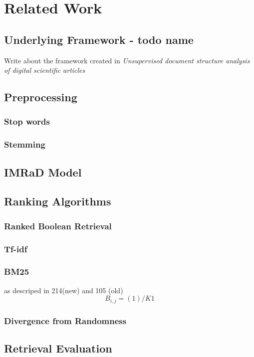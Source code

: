 \chapter{Related Work}
\label{cha:related_work}

\section{Underlying Framework - todo name}
\label{sec:underlying-framework}

Write about the framework created in \textit{Unsupervised document structure analysis of digital scientific articles}

\section{Preprocessing}
\label{sec:preprocessing}

\subsection{Stop words}
\label{sec:stop_words}

\subsection{Stemming}
\label{sec:stemming}

\section{IMRaD Model}
\label{sec:imrad-model}


\section{Ranking Algorithms}
\label{sec:ranking_algorithms}

\subsection{Ranked Boolean Retrieval}
\label{sec:ranked_boolean_retrieval}

\subsection{Tf-idf}
\label{sec:tfidf}

\subsection{BM25}
\label{sec:bm25}
as descriped in 214(new) and 105 (old) \\
\begin{equation}
  B_{i,j} = {(1)}/{K1}
\end{equation}

\subsection{Divergence from Randomness}
\label{sec:divergence_from_randomness}

\section{Retrieval Evaluation}
\label{sec:retrieval_evaluation}
